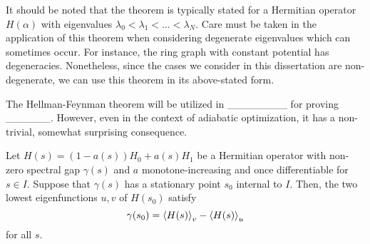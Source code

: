     It should be noted that the theorem is typically stated for a Hermitian operator $H(\alpha)$ with eigenvalues $\lambda_0 < \lambda_1 < \dots < \lambda_N$. Care must be taken in the application of this theorem when considering degenerate eigenvalues \cite{Vatsya2004,Zhang2004} which can sometimes occur. For instance, the ring graph with constant potential has degeneracies. Nonetheless, since the cases we consider in this dissertation are non-degenerate, we can use this theorem in its above-stated form.
    
    The Hellman-Feynman theorem will be utilized in ________ for proving ______. However, even in the context of adiabatic optimization, it has a non-trivial, somewhat surprising consequence.
    
    \begin{thm}\label{thm:gap-conservation}
        Let $H(s) = (1-a(s))H_0 + a(s) H_1$ be a Hermitian operator with non-zero spectral gap $\gamma(s)$ and $a$ monotone-increasing and once differentiable for $s \in I$. Suppose that $\gamma(s)$ has a stationary point $s_0$ internal to $I$. Then, the two lowest eigenfunctions $u,v$ of $H(s_0)$ satisfy
        \[
            \gamma(s_0) = \left \langle H(s) \right \rangle_v - \left \langle H(s) \right \rangle_u
        \]
        for all $s$.
    \end{thm}
    
